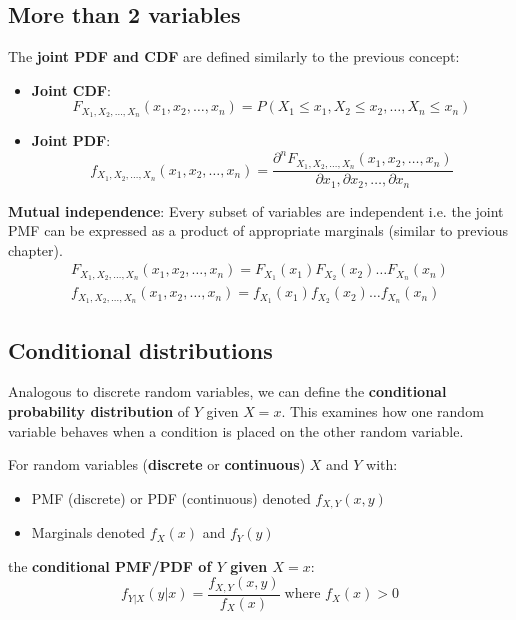 \documentclass[10pt,a4paper]{article}
\begin{document}
\subsection{More than 2 variables}

The \textbf{joint PDF and CDF} are defined similarly to the previous concept:
\begin{itemize}
    \item \textbf{Joint CDF}:
    $$
        F_{X_1,X_2,\dots,X_n}(x_1, x_2,\dots,x_n) = P(X_1\leq x_1, X_2\leq x_2,\dots,X_n\leq x_n)
    $$
    \item \textbf{Joint PDF}:
    $$
        f_{X_1,X_2,\dots,X_n}(x_1, x_2,\dots,x_n) = \frac{\partial^n F_{X_1,X_2,\dots,X_n}(x_1, x_2,\dots,x_n)}{\partial x_1, \partial x_2, \dots, \partial x_n}
    $$
\end{itemize} 

\begin{tcolorbox}[breakable,colback=white]
\textbf{Mutual independence}: Every subset of variables are independent i.e. the joint PMF can be
expressed as a product of appropriate marginals (similar to previous chapter).
\begin{align*}
    F_{X_1,X_2,\dots,X_n}(x_1, x_2,\dots,x_n) = F_{X_1}(x_1)F_{X_2}(x_2)\dots F_{X_n}(x_n) \\
    f_{X_1,X_2,\dots,X_n}(x_1, x_2,\dots,x_n) = f_{X_1}(x_1)f_{X_2}(x_2)\dots f_{X_n}(x_n)
\end{align*}
\end{tcolorbox}

\subsection{Conditional distributions}

Analogous to discrete random variables, we can deﬁne the \textbf{conditional probability distribution}
of $Y$ given $X=x$. This examines how one random variable behaves when a condition is placed on the
other random variable.

\begin{tcolorbox}[breakable,colback=white]
For random variables (\textbf{discrete} or \textbf{continuous}) $X$ and $Y$ with:
\begin{itemize}
    \item PMF (discrete) or PDF (continuous) denoted $f_{X,Y}(x,y)$
    \item Marginals denoted $f_X(x)$ and $f_Y(y)$
\end{itemize}
the \textbf{conditional PMF/PDF of $Y$ given $X=x$}:
$$
    f_{Y|X}(y|x) = \frac{f_{X,Y}(x,y)}{f_X(x)} \; \text{where } f_X(x) > 0
$$
\end{tcolorbox}
\end{document}
